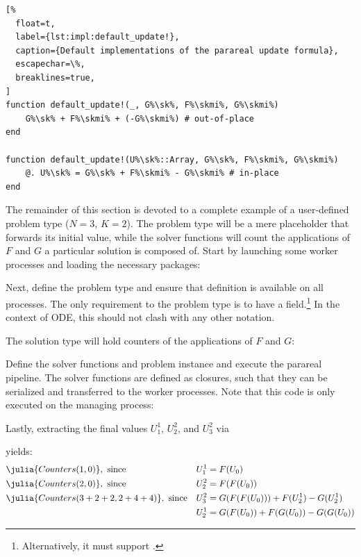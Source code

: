 \def\sk{\textsuperscript{k}}
\def\skmi{\textsuperscript{k-1}}
\begin{lstlisting}[%
  float=t,
  label={lst:impl:default_update!},
  caption={Default implementations of the parareal update formula},
  escapechar=\%,
  breaklines=true,
]
function default_update!(_, G%\sk%, F%\skmi%, G%\skmi%)
    G%\sk% + F%\skmi% + (-G%\skmi%) # out-of-place
end

function default_update!(U%\sk%::Array, G%\sk%, F%\skmi%, G%\skmi%)
    @. U%\sk% = G%\sk% + F%\skmi% - G%\skmi% # in-place
end
\end{lstlisting}

The remainder of this section is devoted to a complete example of a user-defined problem type ($N=3$, $K=2$).
The problem type will be a mere placeholder that forwards its initial value,
while the solver functions will count the applications of $F$ and $G$ a particular solution is composed of.
Start by launching some worker processes and loading the necessary packages:

Next, define the problem type and ensure that definition is available on all processes.
The only requirement to the problem type is to have a  field.\footnote{%
  Alternatively, it must support .
}
In the context of \ac{ODE}, this should not clash with any other notation.
\addtocounter{lstnumber}{1} %

The solution type will hold counters of the applications of $F$ and $G$:

Define the solver functions and problem instance and execute the parareal pipeline.
The solver functions are defined as closures,
such that they can be serialized and transferred to the worker processes.
Note that this code is only executed on the managing process:

Lastly, extracting the final values $U_1^1$, $U_2^2$, and $U_3^2$ via

yields:
\begin{align*}
  &\julia{Counters(1,0)}, \text{ since} &
  U_1^1 &= F(U_0) \\
  &\julia{Counters(2,0)}, \text{ since} &
  U_2^2 &= F(F(U_0)) \\
  &\julia{Counters(3+2+2,2+4+4)}, \text{ since} &
  U_3^2 &= G(F(F(U_0))) + F(U_2^1) - G(U_2^1) \\
  && U_2^1 &= G(F(U_0)) + F(G(U_0)) - G(G(U_0))
\end{align*}

